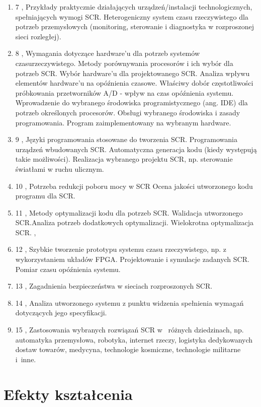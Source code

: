 \documentclass[12pt, a4paper]{article}
\begin{document}
\begin{enumerate}
  \item 7 , Przykłady praktycznie działających urządzeń/instalacji technologicznych, spełniających wymogi SCR. Heterogeniczny system czasu rzeczywistego dla potrzeb przemysłowych (monitoring, sterowanie i diagnostyka w rozproszonej sieci rozległej).
  \item 8 , Wymagania dotyczące hardware’u dla potrzeb systemów czasurzeczywistego. Metody porównywania procesorów i ich wybór dla potrzeb SCR. Wybór hardware’u dla projektowanego SCR. Analiza wpływu elementów hardware’u na opóźnienia czasowe. Właściwy dobór częstotliwości próbkowania przetworników A/D - wpływ na czas opóźnienia systemu. Wprowadzenie do wybranego środowiska programistycznego (ang. IDE) dla potrzeb określonych procesorów. Obsługi wybranego środowiska i zasady programowania. Program zaimplementowany na wybranym hardware.
  \item 9 , Języki programowania stosowane do tworzenia SCR.  Programowania urządzeń wbudowanych SCR. Automatyczna generacja kodu (kiedy występują takie możliwości). Realizacja wybranego projektu SCR, np. sterowanie światłami w ruchu ulicznym.
  \item 10 , Potrzeba redukcji poboru mocy w SCR Ocena jakości utworzonego kodu programu dla SCR.
  \item 11 , Metody optymalizacji kodu dla potrzeb SCR. Walidacja utworzonego SCR.Analiza potrzeb dodatkowych optymalizacji. Wielokrotna optymalizacja SCR. ,
  \item 12 , Szybkie tworzenie prototypu systemu czasu rzeczywistego, np. z wykorzystaniem układów FPGA. Projektowanie i symulacje zadanych SCR. Pomiar czasu opóźnienia systemu.
  \item 13 , Zagadnienia bezpieczeństwa w sieciach rozproszonych SCR.
  \item 14 , Analiza utworzonego systemu z punktu widzenia spełnienia wymagań dotyczących jego specyfikacji.
  \item 15 , Zastosowania wybranych rozwiązań SCR w  różnych dziedzinach, np. automatyka przemysłowa, robotyka, internet rzeczy, logistyka dedykowanych dostaw towarów, medycyna, technologie kosmiczne, technologie militarne i inne.
\end{enumerate}

\section{Efekty kształcenia}
\end{document}
